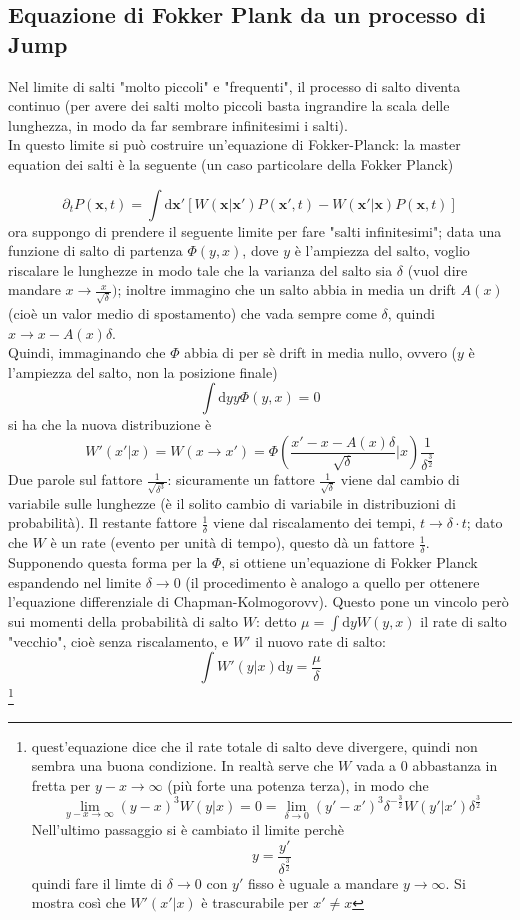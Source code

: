 \documentclass[a4paper,12pt]{article}
\theoremstyle{plain}
\renewcommand{\vec}[1]{{\boldsymbol{#1}}}
\theoremstyle{definition}
\newcommand{\f}[2]{\frac{#1}{#2}}
\newcommand{\tdv}{\partial_t}
\renewcommand{\d}{\text{d}}
\newcommand{\pos}{\vec{x}}
\newcommand{\ra}{\rightarrow}
\theoremstyle{remark}
\begin{document}
\subsection{Equazione di Fokker Plank da un processo di Jump}
Nel limite di salti "molto piccoli" e "frequenti", il processo di salto diventa continuo (per avere dei salti molto piccoli basta ingrandire la scala delle lunghezza,  in modo da far sembrare infinitesimi i salti).
\\ In questo limite si può costruire un'equazione di Fokker-Planck: la master equation dei salti è la seguente (un caso particolare della Fokker Planck)

\[\tdv P(\pos,t)=\int \d \pos'	\left[W(\pos|\pos')P(\pos',t)-W(\pos'|\pos)P(\pos,t)\right]	\]
ora suppongo di prendere il seguente limite per fare "salti infinitesimi"; data una funzione di salto di partenza $\Phi(y,x)$, dove $y$ è l'ampiezza del salto, voglio riscalare le lunghezze in modo tale che la varianza del salto sia $\delta$ (vuol dire mandare $x\ra \f{x}{\sqrt{\delta}}) $; inoltre immagino che un salto abbia in media un drift $A(x)$ (cioè un valor medio di spostamento) che vada sempre come $\delta$, quindi $x\ra x-A(x) \delta$.\\Quindi, immaginando che $\Phi$ abbia di per sè drift in media nullo, ovvero ($y$ è l'ampiezza del salto, non la posizione finale)
\[\int \d y	y\Phi(y,x)=0	\]
si ha che la nuova distribuzione è
\begin{equation}
W'(x'|x)=W(x\ra x')=\Phi\left(\f{x'-x- A(x)\delta}{\sqrt{\delta}}|x\right)\f{1}{\delta^{\f{3}{2}}}		\label{kkk}\end{equation}	
Due parole sul fattore $\f{1}{\sqrt{\delta^3}}$: sicuramente un fattore $\f{1}{\sqrt{\delta}}$ viene dal cambio di variabile sulle lunghezze (è il solito cambio di variabile in distribuzioni di probabilità). Il restante fattore $\f{1}{\delta}$ viene dal riscalamento dei tempi,  $ t \ra \delta \cdot t$; dato che $W$ è un rate (evento per unità di tempo), questo dà un fattore  $\f{1}{\delta}$.\\
Supponendo questa forma per la $\Phi$, si ottiene un'equazione di Fokker Planck espandendo nel limite $\delta\ra 0$ (il procedimento è analogo a quello per ottenere l'equazione differenziale di Chapman-Kolmogorovv). Questo pone un vincolo però sui momenti della probabilità di salto $W$: detto $\mu=\int \d y W(y,x)$ il rate di salto "vecchio", cioè senza riscalamento, e $W'$ il nuovo rate di salto:
\[\int 	W'(y|x) \d y=\f{\mu}{\delta}	\]\footnote{
quest'equazione dice che il rate totale di salto deve divergere, quindi non sembra una buona condizione. In realtà serve che $W$ vada a $0$ abbastanza in fretta per $y-x\ra\infty$ (più forte una potenza terza), in modo che
\[\lim_{y-x\ra \infty} (y-x)^3 W(y|x)=0=\lim_{\delta\ra0} (y'-x')^3 \delta^{-\f{3}{2}} W(y'|x') \delta^{\f{3}{2}}\]
Nell'ultimo passaggio si è cambiato il limite perchè
\[y=\f{y'}{\delta^{ \f{3}{2}}}\]
	quindi fare il limte di $\delta\ra 0$ con $y'$ fisso è uguale a mandare $y\ra \infty$. Si mostra così che  $W'(x'|x)$ è trascurabile per $x'\ne x$}
\end{document}
